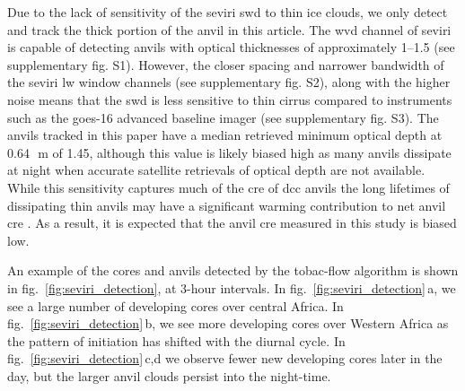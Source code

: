 \documentclass[acp, manuscript]{copernicus}
\begin{document}
Due to the lack of sensitivity of the \acrshort{seviri} \acrshort{swd} to thin ice clouds, we only detect and track the thick portion of the anvil in this article.
The \acrshort{wvd} channel of \acrshort{seviri} is capable of detecting anvils with optical thicknesses of approximately 1--1.5 (see supplementary fig. S1).
However, the closer spacing and narrower bandwidth of the \acrshort{seviri} \acrshort{lw} window channels (see supplementary fig. S2), along with the higher noise means that the \acrshort{swd} is less sensitive to thin cirrus compared to instruments such as the \acrshort{goes}-16 advanced baseline imager (see supplementary fig. S3).
The anvils tracked in this paper have a median retrieved minimum optical depth at 0.64\,\unit{\mu m} of 1.45, although this value is likely biased high as many anvils dissipate at night when accurate satellite retrievals of optical depth are not available.
While this sensitivity captures much of the \acrshort{cre} of \acrshort{dcc} anvils \citep{berry_cloud_2014} the long lifetimes of dissipating thin anvils may have a significant warming contribution to net anvil \acrshort{cre} \citep{horner_evolution_2023}.
As a result, it is expected that the anvil \acrshort{cre} measured in this study is biased low.

An example of the cores and anvils detected by the tobac-flow algorithm is shown in fig.~\ref{fig:seviri_detection}, at 3-hour intervals. In fig.~\ref{fig:seviri_detection}\,a, we see a large number of developing cores over central Africa. 
In fig.~\ref{fig:seviri_detection}\,b, we see more developing cores over Western Africa as the pattern of initiation has shifted with the diurnal cycle.
In fig.~\ref{fig:seviri_detection}\,c,d we observe fewer new developing cores later in the day, but the larger anvil clouds persist into the night-time.
\end{document}
